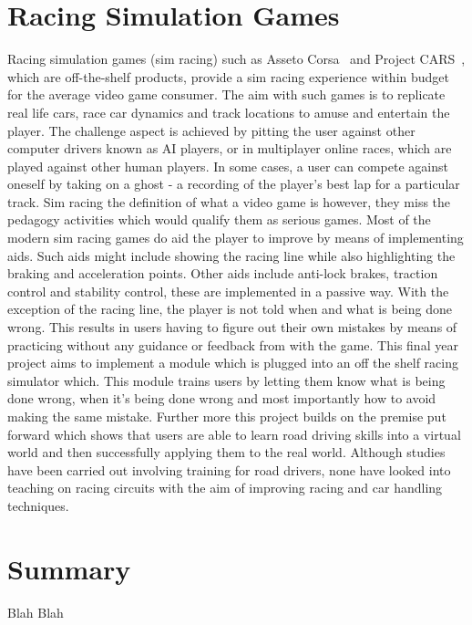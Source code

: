 \section{Racing Simulation Games}
Racing simulation games (sim racing) such as Asseto Corsa~\cite{assestoCorsa} and Project CARS~\cite{ProjectCars}, which are off-the-shelf products, provide a sim racing experience within budget for the average video game consumer. The aim with such games is to replicate real life cars, race car dynamics and track locations to amuse and entertain the player. The challenge aspect is achieved by pitting the user against other computer drivers known as AI players, or in multiplayer online races, which are played against other human players. In some cases, a user can compete against oneself by taking on a ghost - a recording of the player's best lap for a particular track. Sim racing the definition of what a video game is however, they miss the pedagogy activities which would qualify them as serious games. Most of the modern sim racing games do aid the player to improve by means of implementing aids. Such aids might include showing the racing line while also highlighting the braking and acceleration points. Other aids include anti-lock brakes, traction control and stability control, these are implemented in a passive way. With the exception of the racing line, the player is not told when and what is being done wrong. This results in users having to figure out their own mistakes by means of practicing without any guidance or feedback from with the game. This final year project aims to implement a module which is plugged into an off the shelf racing simulator which. This module trains users by letting them know what is being done wrong, when it's being done wrong and most importantly how to avoid making the same mistake. Further more this project builds on the premise put forward which shows that users are able to learn road driving skills into a virtual world and then successfully applying them to the real world\cite{li2015can}\cite{vogel2006computer}. Although studies have been carried out involving training for road drivers, none have looked into teaching on racing circuits with the aim of improving racing and car handling techniques.

\section{Summary}

Blah Blah